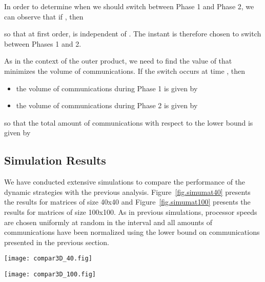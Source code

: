 \documentclass[a4paper,10pt]{article}
\begin{document}
In order to determine when we should switch between Phase 1 and Phase 2, we
can observe that if , then 

so that at first order,  is independent of . The instant
 is therefore chosen to
switch between Phases 1 and 2.

As in the context of the outer product, we need to find the value of  that minimizes the volume of communications. If the switch occurs at time , then
\begin{itemize}
\item the volume of communications during Phase 1 is given by 
\item the volume of communications during Phase 2 is given by 
\end{itemize}
so that the total amount of communications with respect to the lower bound  is given by










\subsection{Simulation Results}



We have conducted extensive simulations to compare the performance of
the dynamic strategies with the previous analysis.
Figure~\ref{fig.simumat40} presents the results for matrices of size
40x40 and Figure~\ref{fig.simumat100} presents the results for matrices of size
100x100. As in previous simulations, processor speeds are chosen
uniformly at random in the interval  and all amounts of
communications have been normalized using the lower bound  on
communications presented in the previous section.



\begin{figure*}[htbp]
  \centering
  \texttt{[image: compar3D\_40.fig]}
  \caption{Communication amounts of all strategies for matrices of size 
    blocks ( tasks).}
  \label{fig.simumat40}
\end{figure*}

\begin{figure*}[htbp]
  \centering
  \texttt{[image: compar3D\_100.fig]}
  \caption{Communication amounts of all strategies for matrices of size 
    blocks ( tasks).}
  \label{fig.simumat100}
\end{figure*}
\end{document}
